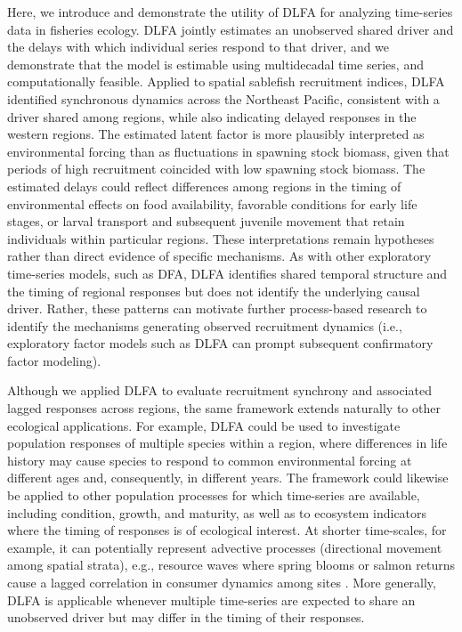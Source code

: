 \documentclass[12pt]{article}
\begin{document}
Here, we introduce and demonstrate the utility of DLFA for analyzing
time-series data in fisheries ecology. DLFA jointly estimates an
unobserved shared driver and the delays with which individual series
respond to that driver, and we demonstrate that the model is estimable
using multidecadal time series, and computationally feasible. Applied to
spatial sablefish recruitment indices, DLFA identified synchronous
dynamics across the Northeast Pacific, consistent with a driver shared
among regions, while also indicating delayed responses in the western
regions. The estimated latent factor is more plausibly interpreted as
environmental forcing than as fluctuations in spawning stock biomass,
given that periods of high recruitment coincided with low spawning stock
biomass. The estimated delays could reflect differences among regions in
the timing of environmental effects on food availability, favorable
conditions for early life stages, or larval transport and subsequent
juvenile movement that retain individuals within particular regions.
These interpretations remain hypotheses rather than direct evidence of
specific mechanisms. As with other exploratory time-series models, such
as DFA, DLFA identifies shared temporal structure and the timing of
regional responses but does not identify the underlying causal driver.
Rather, these patterns can motivate further process-based research to
identify the mechanisms generating observed recruitment dynamics (i.e.,
exploratory factor models such as DLFA can prompt subsequent
confirmatory factor modeling).

Although we applied DLFA to evaluate recruitment synchrony and
associated lagged responses across regions, the same framework extends
naturally to other ecological applications. For example, DLFA could be
used to investigate population responses of multiple species within a
region, where differences in life history may cause species to respond
to common environmental forcing at different ages and, consequently, in
different years. The framework could likewise be applied to other
population processes for which time-series are available, including
condition, growth, and maturity, as well as to ecosystem indicators
where the timing of responses is of ecological interest. At shorter
time-scales, for example, it can potentially represent advective
processes (directional movement among spatial strata), e.g., resource
waves where spring blooms or salmon returns cause a lagged correlation
in consumer dynamics among sites \citep{armstrong_resource_2016}. More
generally, DLFA is applicable whenever multiple time-series are expected
to share an unobserved driver but may differ in the timing of their
responses.
\end{document}
